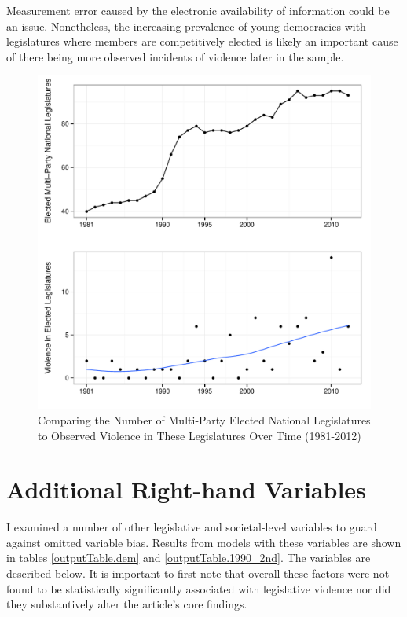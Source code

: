 \documentclass[a4paper]{article}\usepackage[]{graphicx}\usepackage[]{color}
\newenvironment{knitrout}{}{} %
\begin{document}
Measurement error caused by the electronic availability of information could be an issue. Nonetheless, the increasing prevalence of young democracies with legislatures where members are competitively elected is likely an important cause of there being more observed incidents of violence later in the sample.

\begin{figure}

    \begin{center}
\begin{knitrout}
\color{fgcolor}
\includegraphics[width=0.8\linewidth]{figure/compareLegToViolence-1} 

\end{knitrout}
    \end{center}

    \caption{Comparing the Number of Multi-Party Elected National Legislatures to Observed Violence in These Legislatures Over Time (1981-2012)}
    \label{elect_vs_violence}

\end{figure}

\section*{Additional Right-hand Variables}


I examined a number of other legislative and societal-level variables to guard against omitted variable bias. Results from models with these variables are shown in tables \ref{outputTable.dem} and \ref{outputTable.1990_2nd}. The variables are described below. It is important to first note that overall these factors were not found to be statistically significantly associated with legislative violence nor did they substantively alter the article's core findings.
\end{document}
